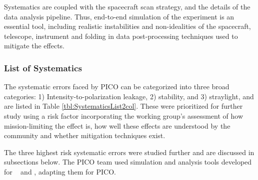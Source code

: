 \documentclass[PICOReport.tex]{subfiles}
\begin{document}
Systematics are coupled with the
spacecraft scan strategy, and the details of the 
data analysis pipeline.
Thus, end-to-end simulation of the experiment is an essential tool,
including realistic instabilities and non-idealities of the spacecraft,
telescope, instrument and folding in data post-processing techniques
used to mitigate the effects.    

\subsubsection{List of Systematics}
The systematic errors faced by PICO can be categorized into three broad categories: 
1) Intensity-to-polarization leakage, 2) stability, and 3) straylight, and are listed in Table \ref{tbl:SystematicsList2col}. 
These were prioritized for further study using a risk factor incorporating the working group's assessment of how mission-limiting the effect is, how well these effects are understood by the community and whether mitigation techniques exist.  

The three highest risk systematic errors were studied further and are discussed in subsections below.  The PICO team used 
 simulation and analysis tools developed for \planck~\cite{plank2015_xii_focalplane} and \core, adapting them for PICO.

\end{document}
